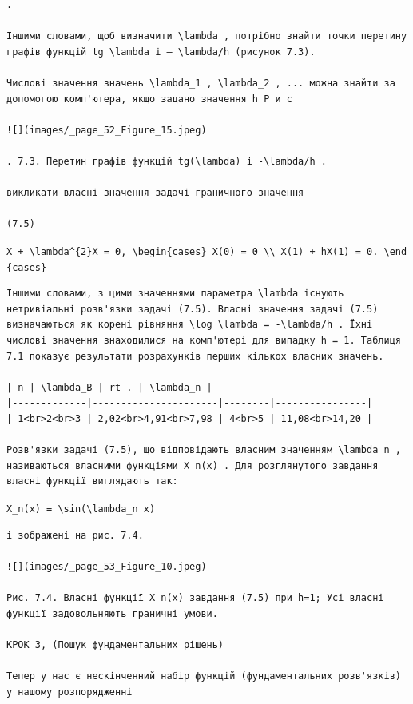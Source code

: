 \documentclass[
  ukrainian,
]{article}
\begin{document}
\begin{verbatim}
.

Іншими словами, щоб визначити \lambda , потрібно знайти точки перетину графів функцій tg \lambda і — \lambda/h (рисунок 7.3).

Числові значення значень \lambda_1 , \lambda_2 , ... можна знайти за допомогою комп'ютера, якщо задано значення h Р и с

![](images/_page_52_Figure_15.jpeg)

. 7.3. Перетин графів функцій tg(\lambda) і -\lambda/h .

викликати власні значення задачі граничного значення

(7.5)
\end{verbatim}

\texttt{X\textquotesingle{}\textquotesingle{}\ +\ \textbackslash{}lambda\^{}\{2\}X\ =\ 0,\ \textbackslash{}begin\{cases\}\ X(0)\ =\ 0\ \textbackslash{}\textbackslash{}\ X\textquotesingle{}(1)\ +\ hX(1)\ =\ 0.\ \textbackslash{}end\{cases\}}

\begin{verbatim}
Іншими словами, з цими значеннями параметра \lambda існують нетривіальні розв'язки задачі (7.5). Власні значення задачі (7.5) визначаються як корені рівняння \log \lambda = -\lambda/h . Їхні числові значення знаходилися на комп'ютері для випадку h = 1. Таблиця 7.1 показує результати розрахунків перших кількох власних значень.

| n | \lambda_B | rt . | \lambda_n |
|-------------|----------------------|--------|----------------|
| 1<br>2<br>3 | 2,02<br>4,91<br>7,98 | 4<br>5 | 11,08<br>14,20 |

Розв'язки задачі (7.5), що відповідають власним значенням \lambda_n , називаються власними функціями X_n(x) . Для розглянутого завдання власні функції виглядають так:
\end{verbatim}

\texttt{X\_n(x)\ =\ \textbackslash{}sin(\textbackslash{}lambda\_n\ x)}

\begin{verbatim}
і зображені на рис. 7.4.

![](images/_page_53_Figure_10.jpeg)

Рис. 7.4. Власні функції X_n(x) завдання (7.5) при h=1; Усі власні функції задовольняють граничні умови.

КРОК 3, (Пошук фундаментальних рішень)

Тепер у нас є нескінченний набір функцій (фундаментальних розв'язків) у нашому розпорядженні
\end{verbatim}
\end{document}
